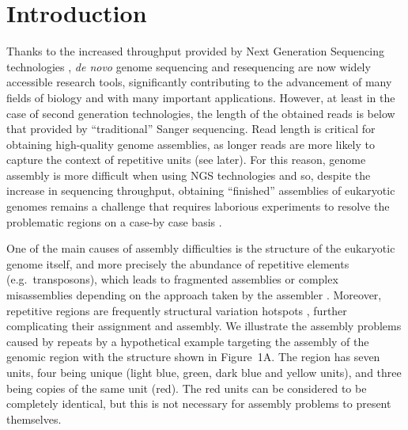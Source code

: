 \documentclass[10pt]{article}
\newcommand{\blue}[1]{{\color{blue} #1}}
\begin{document}

\section*{Introduction}

Thanks to the increased throughput provided by Next Generation Sequencing technologies \cite{Metzker2010}, {\it de novo} genome sequencing and resequencing are now  widely accessible research tools, significantly contributing to the advancement of many fields of biology and with many important applications.
However, at least in the case of second generation 
technologies, the length of the obtained reads is below that provided by ``traditional'' Sanger sequencing. Read length is critical for obtaining high-quality genome assemblies, as longer reads are more likely to capture the context of repetitive units (see later). For this reason, genome assembly is more difficult when using NGS technologies \cite{Treangen11, Flicek2009} and so, despite the increase in sequencing throughput, obtaining ``finished'' assemblies of eukaryotic genomes remains a challenge that requires laborious experiments to resolve the problematic regions on a case-by case basis \cite{Garber2009, International_Human_Genome_Sequencing_Consortium2004}.

One of the main causes of assembly difficulties is the structure of the eukaryotic genome itself, \blue{and} more precisely the abundance of repetitive elements (e.g.~transposons), which leads to fragmented assemblies or complex misassemblies depending on the approach taken by the assembler \cite{Treangen11, Flicek2009}. 
Moreover, repetitive regions are frequently structural variation hotspots \cite{Mills11}, further complicating their assignment and assembly. We illustrate the assembly problems caused by repeats by a hypothetical example targeting the assembly of the genomic region with the structure shown in Figure~1A. The region has seven units, four being unique (light blue, green, dark blue and yellow units), and three being copies of the same unit (red). The red units can be considered to be completely identical, but this is not necessary for assembly problems to present themselves. 
\end{document}
